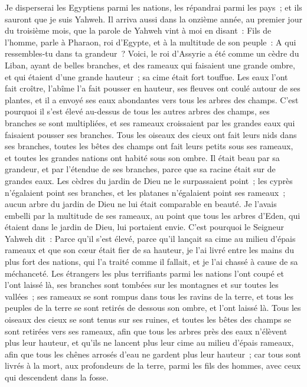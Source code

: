 \begin{multicols}{2}
Je disperserai les Egyptiens parmi les nations, les répandrai parmi les pays~; et ils sauront que je suis Yahweh.
\VerseOne{}Il arriva aussi dans la onzième année, au premier jour du troisième mois, que la parole de Yahweh vint à moi en disant~:
Fils de l'homme, parle à Pharaon, roi d'Egypte, et à la multitude de son peuple~: A qui ressembles-tu dans ta grandeur~?
Voici, le roi d'Assyrie a été comme un cèdre du Liban, ayant de belles branches, et des rameaux qui faisaient une grande ombre, et qui étaient d'une grande hauteur~; sa cime était fort touffue.
Les eaux l'ont fait croître, l'abîme l'a fait pousser en hauteur, ses fleuves ont coulé autour de ses plantes, et il a envoyé ses eaux abondantes vers tous les arbres des champs.
C'est pourquoi il s'est élevé au-dessus de tous les autres arbres des champs, ses branches se sont multipliées, et ses rameaux croissaient par les grandes eaux qui faisaient pousser ses branches.
Tous les oiseaux des cieux ont fait leurs nids dans ses branches, toutes les bêtes des champs ont fait leurs petits sous ses rameaux, et toutes les grandes nations ont habité sous son ombre.
Il était beau par sa grandeur, et par l'étendue de ses branches, parce que sa racine était sur de grandes eaux.
Les cèdres du jardin de Dieu ne le surpassaient point~; les cyprès n'égalaient point ses branches, et les platanes n'égalaient point ses rameaux~; aucun arbre du jardin de Dieu ne lui était comparable en beauté.
Je l'avais embelli par la multitude de ses rameaux, au point que tous les arbres d'Eden, qui étaient dans le jardin de Dieu, lui portaient envie.
C'est pourquoi le Seigneur Yahweh dit~: Parce qu'il s'est élevé, parce qu'il lançait sa cime au milieu d'épais rameaux et que son cœur était fier de sa hauteur,
je l'ai livré entre les mains du plus fort des nations, qui l'a traité comme il fallait, et je l'ai chassé à cause de sa méchanceté.
Les étrangers les plus terrifiants parmi les nations l'ont coupé et l'ont laissé là, ses branches sont tombées sur les montagnes et sur toutes les vallées~; ses rameaux se sont rompus dans tous les ravins de la terre, et tous les peuples de la terre se sont retirés de dessous son ombre, et l'ont laissé là.
Tous les oiseaux des cieux se sont tenus sur ses ruines, et toutes les bêtes des champs se sont retirées vers ses rameaux,
afin que tous les arbres près des eaux n'élèvent plus leur hauteur, et qu'ils ne lancent plus leur cime au milieu d'épais rameaux, afin que tous les chênes arrosés d'eau ne gardent plus leur hauteur~; car tous sont livrés à la mort, aux profondeurs de la terre, parmi les fils des hommes, avec ceux qui descendent dans la fosse.

\end{multicols}
